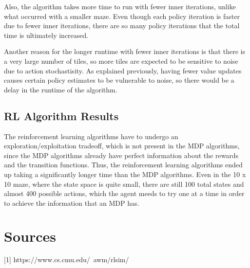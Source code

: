 \documentclass[11pt]{article}
\begin{document}
            Also, the algorithm takes more time to run with fewer inner iterations, unlike what
            occurred with a smaller maze. Even though each policy iteration is faster due to
            fewer inner iterations, there are so many policy iterations that the total time
            is ultimately increased.
            
            Another reason for the longer runtime with fewer inner iterations is that there is a very large number of
            tiles, so more tiles are expected to be sensitive to noise due to action
            stochastisity. As explained previously,
            having fewer value updates causes certain policy estimates to be vulnerable to noise,
            so there would be a delay in the runtime of the algorithm.

        \subsection{RL Algorithm Results}

        The reinforcement learning algorithms have to undergo an exploration/exploitation
        tradeoff, which is not present in the MDP algorithms, since the MDP algorithms
        already have perfect information about the rewards and the transition functions.
        Thus, the reinforcement learning algorithms ended up taking a significantly
        longer time than the MDP algorithms. Even in the 10 x 10 maze, where
        the state space is quite small, there are still 100 total states and almost 400
        possible actions, which the agent meeds to try one at a time in order to achieve
        the information that an MDP has.
        \section{Sources}
        
        [1] https://www.cs.cmu.edu/~awm/rlsim/

    
\end{document}
